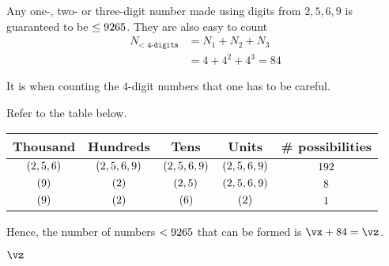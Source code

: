 \begin{solution}[\halfpage]
	Any one-, two- or three-digit number made using digits from $2,5,6,9$ 
	is guaranteed to be $\leq 9265$. They are also easy to count
	\begin{align}
		N_{\texttt{< 4-digits}} &= N_1 + N_2 + N_3 \\ 
		 &= 4 + 4^2 + 4^3 = 84
	\end{align}
	
	It is when counting the 4-digit numbers that one has to be careful. 
  
  Refer to the table below.

	\begin{tabular}{ccccc}
		\toprule
		Thousand & Hundreds & Tens & Units & \# possibilities \\
		\midrule
      $(2,5,6)$ & $(2,5,6,9)$ & $(2,5,6,9)$ & $(2,5,6,9)$ & $192$ \\
      $(9)$ & $(2)$ & $(2,5)$ & $(2,5,6,9)$ & $8$ \\
      $(9)$ & $(2)$ & $(6)$ & $(2)$ & $1$ \\
    \bottomrule
	\end{tabular}

  Hence, the number of numbers $<9265$ that can be formed is $\vx + 84 = \vz$.	
\end{solution}

\ifprintanswers
  \begin{codex}
    $\vz$
  \end{codex}
\fi
